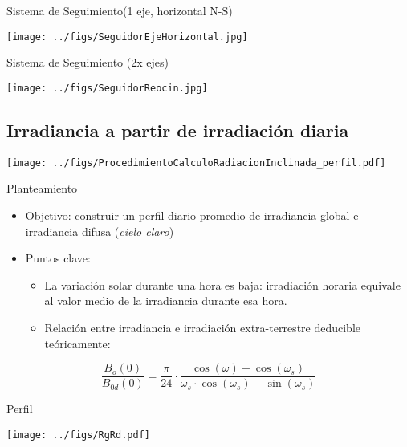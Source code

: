 \documentclass[xcolor={usenames,svgnames,dvipsnames}]{beamer}
\begin{document}
\begin{frame}[label={sec:orgffcb1e4}]{Sistema de Seguimiento(1 eje, horizontal N-S)}
\begin{center}
\texttt{[image: ../figs/SeguidorEjeHorizontal.jpg]}
\end{center}
\end{frame}

\begin{frame}[label={sec:org11bc655}]{Sistema de Seguimiento (2x ejes)}
\begin{center}
\texttt{[image: ../figs/SeguidorReocin.jpg]}
\end{center}
\end{frame}


\subsection{Irradiancia a partir de irradiación diaria}
\label{sec:org7f4b519}
\begin{frame}[label={sec:org35ecf30}]{}
\begin{center}
\texttt{[image: ../figs/ProcedimientoCalculoRadiacionInclinada\_perfil.pdf]}
\end{center}
\end{frame}

\begin{frame}[label={sec:org8afa20e}]{Planteamiento}
\begin{itemize}
\item \alert{Objetivo}: construir un perfil diario promedio de irradiancia global e irradiancia difusa (\emph{cielo claro})
\item \alert{Puntos clave}:
\begin{itemize}
\item La variación solar durante una hora es baja: irradiación horaria equivale al valor medio de la irradiancia durante esa hora.
\item Relación entre irradiancia e irradiación extra-terrestre deducible teóricamente:
\end{itemize}
\end{itemize}

\[
\frac{B_{o}(0)}{B_{0d}(0)}=\frac{\pi}{24}\cdot\frac{\cos(\omega)-\cos(\omega_{s})}{\omega_{s}\cdot\cos(\omega_{s})-\sin(\omega_{s})}
\]
\end{frame}

\begin{frame}[label={sec:org240abce}]{Perfil}
\begin{center}
\texttt{[image: ../figs/RgRd.pdf]}
\end{center}
\end{frame}
\end{document}
